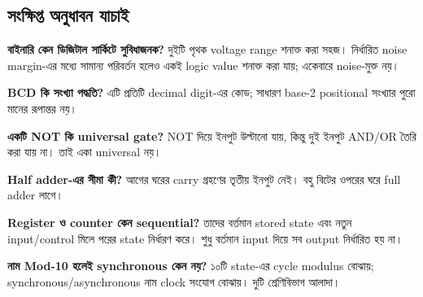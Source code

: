 \subsection{সংক্ষিপ্ত অনুধাবন যাচাই}
\begin{compactenum}
\item \textbf{বাইনারি কেন ডিজিটাল সার্কিটে সুবিধাজনক?} দুইটি পৃথক voltage range শনাক্ত করা সহজ। নির্ধারিত noise margin-এর মধ্যে সামান্য পরিবর্তন হলেও একই logic value শনাক্ত করা যায়; একেবারে noise-মুক্ত নয়।
\item \textbf{BCD কি সংখ্যা পদ্ধতি?} এটি প্রতিটি decimal digit-এর কোড; সাধারণ base-2 positional সংখ্যার পুরো মানের রূপান্তর নয়।
\item \textbf{একটি NOT কি universal gate?} NOT দিয়ে ইনপুট উল্টানো যায়, কিন্তু দুই ইনপুট AND/OR তৈরি করা যায় না। তাই একা universal নয়।
\item \textbf{Half adder-এর সীমা কী?} আগের ঘরের carry গ্রহণের তৃতীয় ইনপুট নেই। বহু বিটের ওপরের ঘরে full adder লাগে।
\item \textbf{Register ও counter কেন sequential?} তাদের বর্তমান stored state এবং নতুন input/control মিলে পরের state নির্ধারণ করে। শুধু বর্তমান input দিয়ে সব output নির্ধারিত হয় না।
\item \textbf{নাম Mod-10 হলেই synchronous কেন নয়?} ১০টি state-এর cycle modulus বোঝায়; synchronous/asynchronous নাম clock সংযোগ বোঝায়। দুটি শ্রেণিবিভাগ আলাদা।
\end{compactenum}
